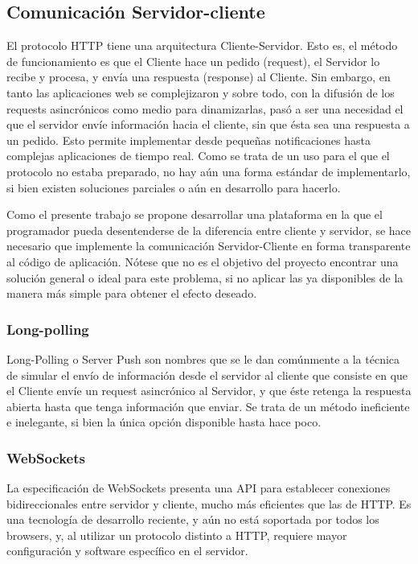 \documentclass[doc,helv,longtable]{article}
\begin{document}
\subsection{Comunicación Servidor-cliente}
El protocolo HTTP tiene una arquitectura Cliente-Servidor. Esto es, el método de funcionamiento es que el Cliente hace un pedido (request), el Servidor lo recibe y procesa, y envía una respuesta (response) al Cliente. Sin embargo, en tanto las aplicaciones web se complejizaron y sobre todo, con la difusión de los requests asincrónicos como medio para dinamizarlas, pasó a ser una necesidad el que el servidor envíe información hacia el cliente, sin que ésta sea una respuesta a un pedido. Esto permite implementar desde pequeñas notificaciones hasta complejas aplicaciones de tiempo real. Como se trata de un uso para el que el protocolo no estaba preparado, no hay aún una forma estándar de implementarlo, si bien existen soluciones parciales o aún en desarrollo para hacerlo\cite{wsvssse}.

Como el presente trabajo se propone desarrollar una plataforma en la que el programador pueda desentenderse de la diferencia entre cliente y servidor, se hace necesario que implemente la comunicación Servidor-Cliente en forma transparente al código de aplicación. Nótese que no es el objetivo del proyecto encontrar una solución general o ideal para este problema, si no aplicar las ya disponibles de la manera más simple para obtener el efecto deseado.

\subsubsection{Long-polling}
Long-Polling o Server Push\cite{longpolling} son nombres que se le dan comúnmente a la técnica de simular el envío de información desde el servidor al cliente que consiste en que el Cliente envíe un request asincrónico al Servidor, y que éste retenga la respuesta abierta hasta que tenga información que enviar. Se trata de un método ineficiente e inelegante, si bien la única opción disponible hasta hace poco.

\subsubsection{WebSockets}
La especificación de WebSockets presenta una API para establecer conexiones bidireccionales entre servidor y cliente, mucho más eficientes que las de HTTP\cite{websockets}. Es una tecnología de desarrollo reciente, y aún no está soportada por todos los browsers, y, al utilizar un protocolo distinto a HTTP, requiere mayor configuración y software específico en el servidor.
\end{document}
